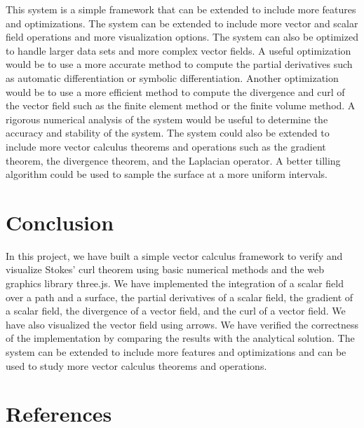 \documentclass[12pt]{article}
\begin{document}
This system is a simple framework that can be extended to include more features and optimizations. The system can be extended to include more vector and scalar field operations and more visualization options. The system can also be optimized to handle larger data sets and more complex vector fields.
A useful optimization would be to use a more accurate method to compute the partial derivatives such as automatic differentiation or symbolic differentiation. Another optimization would be to use a more efficient method to compute the divergence and curl of the vector field such as the finite element method or the finite volume method.
A rigorous numerical analysis of the system would be useful to determine the accuracy and stability of the system. The system could also be extended to include more vector calculus theorems and operations such as the gradient theorem, the divergence theorem, and the Laplacian operator.
A better tilling algorithm could be used to sample the surface at a more uniform intervals.


\newpage
\section{Conclusion}

In this project, we have built a simple vector calculus framework to verify and visualize Stokes' curl theorem using basic numerical methods and the web graphics library three.js. We have implemented the integration of a scalar field over a path and a surface, the partial derivatives of a scalar field, the gradient of a scalar field, the divergence of a vector field, and the curl of a vector field. We have also visualized the vector field using arrows. We have verified the correctness of the implementation by comparing the results with the analytical solution. The system can be extended to include more features and optimizations and can be used to study more vector calculus theorems and operations.

\newpage
\section{References}


\nocite{El-Deeb_PEU-218_Assignments}
\end{document}
